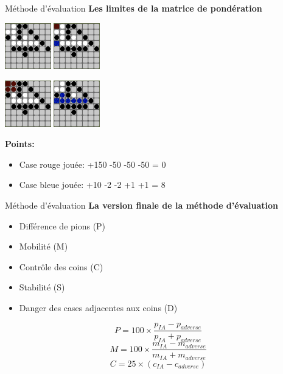 \begin{frame}[t]{Méthode d'évaluation}
    \textbf{Les limites de la matrice de pondération}
    \begin{center}
        \includegraphics[width=0.15\textwidth]{img/matrix_0.png}
        \hspace{0.2\textwidth}
        \includegraphics[width=0.15\textwidth]{img/matrix_1.png}
    \end{center}
    \begin{center}
        \includegraphics[width=0.15\textwidth]{img/matrix_2.png}
        \hspace{0.2\textwidth}
        \includegraphics[width=0.15\textwidth]{img/matrix_3.png}
    \end{center}
    \textbf{Points:}
    \begin{itemize}
        \item Case rouge jouée: +150 -50 -50 -50 = 0
        \item Case bleue jouée: +10 -2 -2 +1 +1 = 8
    \end{itemize}
\end{frame}

\begin{frame}[t]{Méthode d'évaluation}
    \textbf{La version finale de la méthode d'évaluation}
    \begin{itemize}
        \item Différence de pions (P)
        \item Mobilité (M)
        \item Contrôle des coins (C)
        \item Stabilité (S)
        \item Danger des cases adjacentes aux coins (D)
    \end{itemize}
    \vspace{1.5em}
    \[
        P = 100 \times \frac{p_{IA} - p_{adverse}}{p_{IA} + p_{adverse}}
    \]
    \vspace{0.8em}
    \[
        M = 100 \times \frac{m_{IA} - m_{adverse}}{m_{IA} + m_{adverse}}
    \]
    \vspace{0.6em}
    \[
        C = 25 \times {(c_{IA} - c_{adverse})}
    \]
\end{frame}

